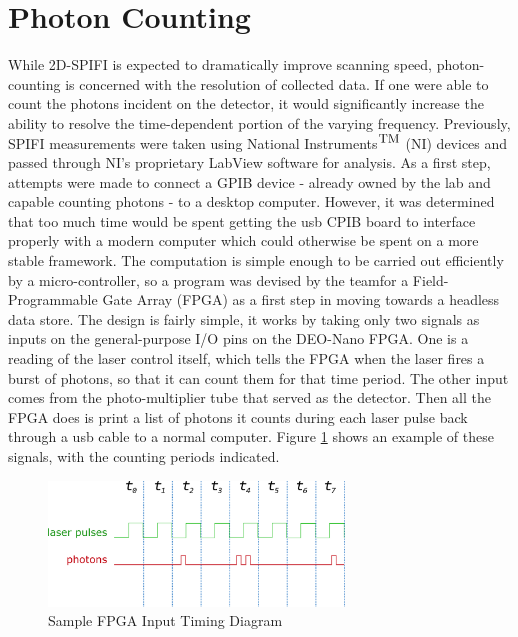 \documentclass[12pt]{article}
\begin{document}
\section*{Photon Counting}
While 2D-SPIFI is expected to dramatically improve scanning speed, photon-counting is concerned with the resolution of collected data. If one were able to count the photons incident on the detector, it would significantly increase the ability to resolve the time-dependent portion of the varying frequency. Previously, SPIFI measurements were taken using National Instruments$^\textnormal{\small TM}$ (NI) devices and passed through NI's proprietary LabView software for analysis. As a first step, attempts were made to connect a GPIB device - already owned by the lab and capable counting photons - to a desktop computer. However, it was determined that too much time would be spent getting the usb CPIB board to interface properly with a modern computer which could otherwise be spent on a more stable framework. The computation is simple enough to be carried out efficiently by a micro-controller, so a program was devised by the teamfor a Field-Programmable Gate Array (FPGA) as a first step in moving towards a headless data store. The design is fairly simple, it works by taking only two signals as inputs on the general-purpose I/O pins on the DEO-Nano FPGA. One is a reading of the laser control itself, which tells the FPGA when the laser fires a burst of photons, so that it can count them for that time period. The other input comes from the photo-multiplier tube that served as the detector. Then all the FPGA does is print a list of photons it counts during each laser pulse back through a usb cable to a normal computer. Figure \ref{fig:timing} shows an example of these signals, with the counting periods indicated.

\begin{figure}[ht]
	\centering
	\includegraphics[width=0.7\textwidth]{sample-timing-diagram}
	\caption{Sample FPGA Input Timing Diagram}
	\label{fig:timing}
\end{figure}
\end{document}

